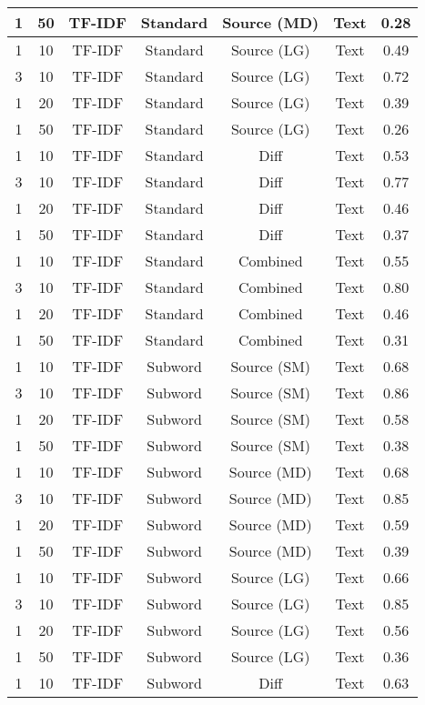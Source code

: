 \begin{longtable}{|c|c|c|c|c|c|c|}
1 & 50 & TF-IDF & Standard & Source (MD) & Text & 0.28 \\
\hline
1 & 10 & TF-IDF & Standard & Source (LG) & Text & 0.49 \\
\hline
3 & 10 & TF-IDF & Standard & Source (LG) & Text & 0.72 \\
\hline
1 & 20 & TF-IDF & Standard & Source (LG) & Text & 0.39 \\
\hline
1 & 50 & TF-IDF & Standard & Source (LG) & Text & 0.26 \\
\hline
1 & 10 & TF-IDF & Standard & Diff & Text & 0.53 \\
\hline
3 & 10 & TF-IDF & Standard & Diff & Text & 0.77 \\
\hline
1 & 20 & TF-IDF & Standard & Diff & Text & 0.46 \\
\hline
1 & 50 & TF-IDF & Standard & Diff & Text & 0.37 \\
\hline
1 & 10 & TF-IDF & Standard & Combined & Text & 0.55 \\
\hline
3 & 10 & TF-IDF & Standard & Combined & Text & 0.80 \\
\hline
1 & 20 & TF-IDF & Standard & Combined & Text & 0.46 \\
\hline
1 & 50 & TF-IDF & Standard & Combined & Text & 0.31 \\
\hline
1 & 10 & TF-IDF & Subword & Source (SM) & Text & 0.68 \\
\hline
3 & 10 & TF-IDF & Subword & Source (SM) & Text & 0.86 \\
\hline
1 & 20 & TF-IDF & Subword & Source (SM) & Text & 0.58 \\
\hline
1 & 50 & TF-IDF & Subword & Source (SM) & Text & 0.38 \\
\hline
1 & 10 & TF-IDF & Subword & Source (MD) & Text & 0.68 \\
\hline
3 & 10 & TF-IDF & Subword & Source (MD) & Text & 0.85 \\
\hline
1 & 20 & TF-IDF & Subword & Source (MD) & Text & 0.59 \\
\hline
1 & 50 & TF-IDF & Subword & Source (MD) & Text & 0.39 \\
\hline
1 & 10 & TF-IDF & Subword & Source (LG) & Text & 0.66 \\
\hline
3 & 10 & TF-IDF & Subword & Source (LG) & Text & 0.85 \\
\hline
1 & 20 & TF-IDF & Subword & Source (LG) & Text & 0.56 \\
\hline
1 & 50 & TF-IDF & Subword & Source (LG) & Text & 0.36 \\
\hline
1 & 10 & TF-IDF & Subword & Diff & Text & 0.63 \\

\end{longtable}
